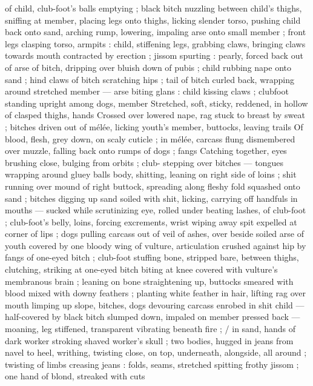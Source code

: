 of child, club-foot's balls emptying ; black bitch nuzzling between 
child's thighs, sniffing at member, placing legs onto thighs, licking 
slender torso, pushing child back onto sand, arching rump, lowering, 
impaling arse onto small member ; front legs clasping torso, armpits 
: child, stiffening legs, grabbing claws, bringing claws towards mouth 
contracted by erection ; jissom spurting : pearly, forced back out of 
arse of bitch, dripping over bluish down of pubis ; child rubbing 
nape onto sand ; hind claws of bitch scratching hips ; tail of bitch 
curled back, wrapping around stretched member --- arse biting glans 
: child kissing claws ; clubfoot standing upright among dogs, member 
Stretched, soft, sticky, reddened, in hollow of clasped thighs, hands 
Crossed over lowered nape, rag stuck to breast by sweat ; bitches 
driven out of mélée, licking youth's member, buttocks, leaving trails 
Of blood, flesh, grey down, on scaly cuticle ; in mélée, carcass flung 
dismembered over muzzle, falling back onto rumps of dogs ; fangs 
Catching together, eyes brushing close, bulging from orbits ; club- 
stepping over bitches --- tongues wrapping around gluey balls 
body, shitting, leaning on right side of loins ; shit running over 
mound of right buttock, spreading along fleshy fold squashed onto 
sand ; bitches digging up sand soiled with shit, licking, carrying off 
handfuls in mouths --- sucked while scrutinizing eye, rolled under 
beating lashes, of club-foot ; club-foot's belly, loins, forcing 
excrements, wrist wiping away spit expelled at corner of lips ; dogs 
pulling carcass out of veil of ashes, over beside soiled arse of youth 
covered by one bloody wing of vulture, articulation crushed against 
hip by fangs of one-eyed bitch ; club-foot stuffing bone, stripped 
bare, between thighs, clutching, striking at one-eyed bitch biting at 
knee covered with vulture's membranous brain ; leaning on bone 
straightening up, buttocks smeared with blood mixed with downy 
feathers ; planting white feather in hair, lifting rag over mouth 
limping up slope, bitches, dogs devouring carcass enrobed in shit 
child --- half-covered by black bitch slumped down, impaled on 
member pressed back --- moaning, leg stiffened, transparent 
vibrating beneath fire ; {\slash} in sand, hands of dark worker stroking 
shaved worker's skull ; two bodies, hugged in jeans from navel to 
heel, writhing, twisting close, on top, underneath, alongside, all 
around ; twisting of limbs creasing jeans : folds, seams, stretched 
spitting frothy jissom ; one hand of blond, streaked with cuts 
